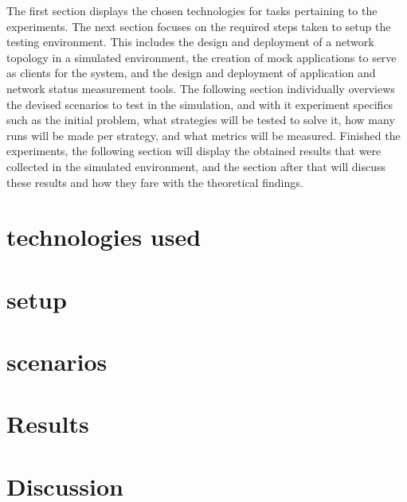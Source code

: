     The first section displays the chosen technologies for tasks pertaining to the experiments.
    The next section focuses on the required steps taken to setup the testing environment.
    This includes the design and deployment of a network topology in a simulated environment, the creation of mock applications to serve as clients for the system, and the design and deployment of application and network status measurement tools.
    The following section individually overviews the devised scenarios to test in the simulation, and with it experiment specifics such as the initial problem, what strategies will be tested to solve it, how many runs will be made per strategy, and what metrics will be measured.
    Finished the experiments, the following section will display the obtained results that were collected in the simulated environment, and the section after that will discuss these results and how they fare with the theoretical findings.

\section{technologies used}


\section{setup}



\section{scenarios}
\section{Results}
\section{Discussion}

